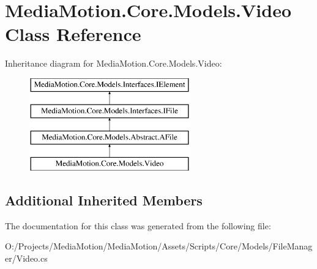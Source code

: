 \hypertarget{class_media_motion_1_1_core_1_1_models_1_1_video}{\section{Media\+Motion.\+Core.\+Models.\+Video Class Reference}
\label{class_media_motion_1_1_core_1_1_models_1_1_video}
}
Inheritance diagram for Media\+Motion.\+Core.\+Models.\+Video\+:\begin{figure}[H]
\begin{center}
\leavevmode
\includegraphics[height=4.000000cm]{class_media_motion_1_1_core_1_1_models_1_1_video}
\end{center}
\end{figure}
\subsection*{Additional Inherited Members}


The documentation for this class was generated from the following file\+:\begin{DoxyCompactItemize}
\item 
O\+:/\+Projects/\+Media\+Motion/\+Media\+Motion/\+Assets/\+Scripts/\+Core/\+Models/\+File\+Manager/Video.\+cs\end{DoxyCompactItemize}
